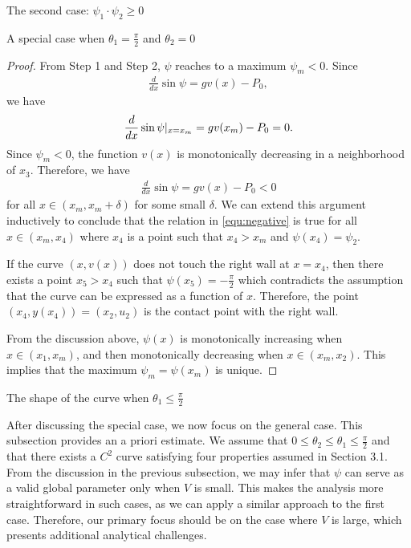 \documentclass[letterpaper,reqno,10pt,twoside]{amsart}
\theoremstyle{definition}
\theoremstyle{remark}
\begin{document}
\begin{section}{The second case: $\psi_1\cdot \psi_2\geq 0$ }
\begin{subsection}{A special case when $\theta_1=\frac{\pi}{2}$ and $\theta_2=0$}
\begin{proof}
    From Step 1 and Step 2, $\psi$ reaches to a maximum $\psi_{m}<0$. Since
    \begin{align}
        \frac{d}{dx}\sin\psi=gv(x)-P_{0},
    \end{align}
    we have
    \begin{align}{\label{equ:negative}}
        \frac{d}{dx}\sin\psi|_{x=x_{m}}=gv(x_{m})-P_{0}=0.
    \end{align}
    \noindent Since $\psi_{m}<0$, the function $v(x)$ is monotonically decreasing in a neighborhood of $x_{3}$. Therefore, we have
    \begin{align}
        \frac{d}{dx}\sin\psi=gv(x)-P_{0}<0
    \end{align}
    for all $x\in (x_{m},x_{m}+\delta)$ for some small $\delta$. We can extend this argument inductively to conclude that the relation in \eqref{equ:negative} is true for all $x\in (x_{m},x_{4})$ where $x_{4}$ is a point such that $x_{4}>x_{m}$ and $\psi(x_{4})=\psi_{2}$. 
    
    If the curve $(x,v(x))$ does not touch the right wall at $x= x_{4}$, then there exists a point $x_{5}>x_{4}$ such that $\psi(x_{5})=-\frac{\pi}{2}$ which contradicts the assumption that the curve can be expressed as a function of $x$. Therefore, the point $(x_{4},y(x_{4}))=(x_{2},u_{2})$ is the contact point with the right wall. 

    From the discussion above, $\psi(x)$ is monotonically increasing when $x\in (x_{1},x_{m})$, and then monotonically decreasing when $x\in (x_{m},x_{2})$. This implies that the maximum $\psi_{m}=\psi(x_{m})$ is unique.
    
    \end{proof}
 
    \end{subsection}

    \begin{subsection}{The shape of the curve when $\theta_1\leq \frac{\pi}{2}$}

     After discussing the special case, we now focus on the general case. This subsection provides an a priori estimate.  We assume that $0\leq \theta_2\leq \theta_1\leq \frac{\pi}{2}$ and that there exists a $C^{2}$ curve satisfying four properties assumed in Section 3.1. From the discussion in the previous subsection, we may infer that $\psi$ can serve as a valid global parameter only when $V$ is small. This makes the analysis more straightforward in such cases, as we can apply a similar approach to the first case. Therefore, our primary focus should be on the case where $V$ is large, which presents additional analytical challenges.
     

\end{subsection}
\end{section}
\end{document}
